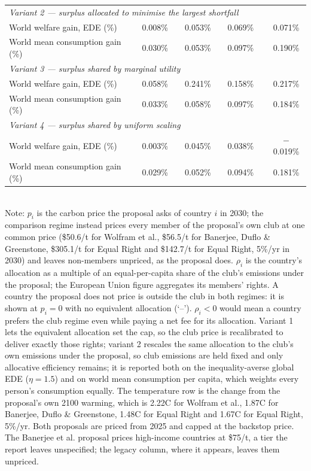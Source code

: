 \begin{table}[htbp]
\begin{tabular}{lcccccccc}
  \midrule
  \multicolumn{9}{l}{\textit{Variant 2 --- surplus allocated to minimise the largest shortfall}} \\
  \quad World welfare gain, EDE (\%) &  & 0.008\% &  & 0.053\% &  & 0.069\% &  & 0.071\% \\
  \quad World mean consumption gain (\%) &  & 0.030\% &  & 0.053\% &  & 0.097\% &  & 0.190\% \\
  \midrule
  \multicolumn{9}{l}{\textit{Variant 3 --- surplus shared by marginal utility}} \\
  \quad World welfare gain, EDE (\%) &  & 0.058\% &  & 0.241\% &  & 0.158\% &  & 0.217\% \\
  \quad World mean consumption gain (\%) &  & 0.033\% &  & 0.058\% &  & 0.097\% &  & 0.184\% \\
  \midrule
  \multicolumn{9}{l}{\textit{Variant 4 --- surplus shared by uniform scaling}} \\
  \quad World welfare gain, EDE (\%) &  & 0.003\% &  & 0.045\% &  & 0.038\% &  & $-$0.019\% \\
  \quad World mean consumption gain (\%) &  & 0.029\% &  & 0.052\% &  & 0.094\% &  & 0.181\% \\
  \bottomrule
\end{tabular}
\label{tab:equiv_rights_B}
\\[4pt]
{\footnotesize Note: $p_i$ is the carbon price the proposal asks of country $i$ in 2030; the comparison regime instead prices every member of the proposal's own club at one common price (\$50.6/t for Wolfram et al., \$56.5/t for Banerjee, Duflo \& Greenstone, \$305.1/t for Equal Right and \$142.7/t for Equal Right, 5\%/yr in 2030) and leaves non-members unpriced, as the proposal does. $\rho_i$ is the country's allocation as a multiple of an equal-per-capita share of the club's emissions under the proposal; the European Union figure aggregates its members' rights. A country the proposal does not price is outside the club in both regimes: it is shown at $p_i=0$ with no equivalent allocation (`--'). $\rho_i < 0$ would mean a country prefers the club regime even while paying a net fee for its allocation. Variant 1 lets the equivalent allocation set the cap, so the club price is recalibrated to deliver exactly those rights; variant 2 rescales the same allocation to the club's own emissions under the proposal, so club emissions are held fixed and only allocative efficiency remains; it is reported both on the inequality-averse global EDE ($\eta=1.5$) and on world mean consumption per capita, which weights every person's consumption equally. The temperature row is the change from the proposal's own 2100 warming, which is 2.22\textdegree{}C for Wolfram et al., 1.87\textdegree{}C for Banerjee, Duflo \& Greenstone, 1.48\textdegree{}C for Equal Right and 1.67\textdegree{}C for Equal Right, 5\%/yr. Both proposals are priced from 2025 and capped at the backstop price. The Banerjee et al. proposal prices high-income countries at \$75/t, a tier the report leaves unspecified; the legacy column, where it appears, leaves them unpriced.}
\end{table}
